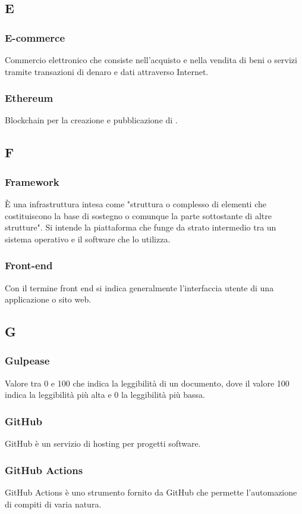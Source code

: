 \subsection*{E}
\subsubsection*{E-commerce} Commercio elettronico che consiste nell'acquisto e nella vendita di beni o servizi tramite transazioni di denaro e dati attraverso Internet.
\subsubsection*{Ethereum} Blockchain per la creazione e pubblicazione di .
\subsection*{F}
\subsubsection*{Framework} È una infrastruttura intesa come "struttura o complesso di elementi che costituiscono la base di sostegno o comunque la parte sottostante di altre strutture". Si intende la piattaforma che funge da strato intermedio tra un sistema operativo e il software che lo utilizza.
\subsubsection*{Front-end} Con il termine front end si indica generalmente l’interfaccia utente di una applicazione o sito web.
\subsection*{G}
\subsubsection*{Gulpease} Valore tra 0 e 100 che indica la leggibilità di un documento, dove il valore 100 indica la leggibilità più alta e 0 la leggibilità più bassa. 
\subsubsection*{GitHub} GitHub è un servizio di hosting per progetti software.
\subsubsection*{GitHub Actions} GitHub Actions è uno strumento fornito da GitHub che permette l’automazione di compiti di varia natura.
